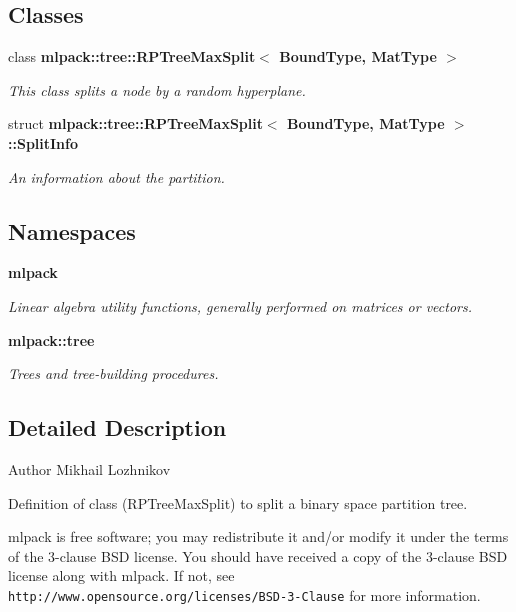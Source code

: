\subsection*{Classes}
\begin{DoxyCompactItemize}
\item 
class {\bf mlpack\+::tree\+::\+R\+P\+Tree\+Max\+Split$<$ Bound\+Type, Mat\+Type $>$}
\begin{DoxyCompactList}\small\item\em This class splits a node by a random hyperplane. \end{DoxyCompactList}\item 
struct {\bf mlpack\+::tree\+::\+R\+P\+Tree\+Max\+Split$<$ Bound\+Type, Mat\+Type $>$\+::\+Split\+Info}
\begin{DoxyCompactList}\small\item\em An information about the partition. \end{DoxyCompactList}\end{DoxyCompactItemize}
\subsection*{Namespaces}
\begin{DoxyCompactItemize}
\item 
 {\bf mlpack}
\begin{DoxyCompactList}\small\item\em Linear algebra utility functions, generally performed on matrices or vectors. \end{DoxyCompactList}\item 
 {\bf mlpack\+::tree}
\begin{DoxyCompactList}\small\item\em Trees and tree-\/building procedures. \end{DoxyCompactList}\end{DoxyCompactItemize}


\subsection{Detailed Description}
\begin{DoxyAuthor}{Author}
Mikhail Lozhnikov
\end{DoxyAuthor}
Definition of class (R\+P\+Tree\+Max\+Split) to split a binary space partition tree.

mlpack is free software; you may redistribute it and/or modify it under the terms of the 3-\/clause B\+SD license. You should have received a copy of the 3-\/clause B\+SD license along with mlpack. If not, see {\tt http\+://www.\+opensource.\+org/licenses/\+B\+S\+D-\/3-\/\+Clause} for more information. 